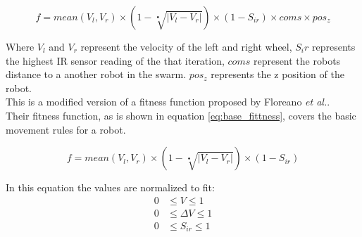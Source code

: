 \begin{equation}\label{eq:full_fittness}
f = mean(V_l, V_r) \times (1 - \sqrt[•]{|V_l - V_r|}) \times (1 - S_{ir}) \times coms \times pos_z
\end{equation}

Where $V_l$ and $V_r$ represent the velocity of the left and right wheel, $S_ir$ represents the highest IR sensor reading of the that iteration, $coms$ represent the robots distance to a another robot in the swarm. $pos_z$ represents the z position of the robot. \\
This is a modified version of a fitness function proposed by Floreano \textit{et al.}\cite{499791}. \\
Their fitness function, as is shown in equation \ref{eq:base_fittness}, covers the basic movement rules for a robot. 

\begin{equation}\label{eq:base_fittness}
f = mean(V_l, V_r) \times ( 1 - \sqrt[•]{|V_l - V_r|}) \times (1 - S_{ir})
\end{equation}

In this equation the values are normalized to fit:
\begin{align*}
	0  &\leq V \leq 1 \\  
	0  &\leq \Delta V  \leq 1 \\
	0  &\leq S_{ir} \leq 1
\end{align*}


